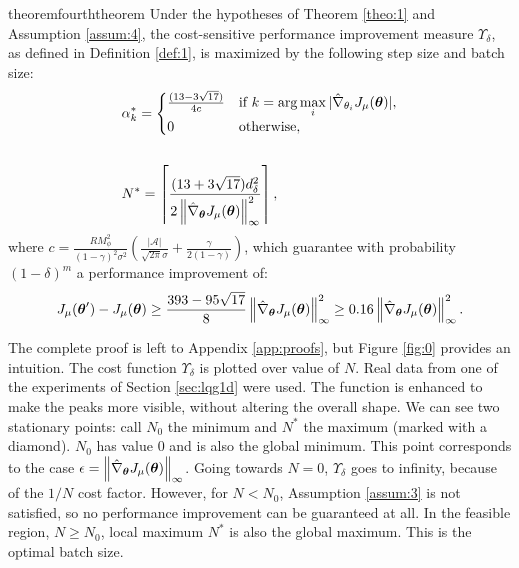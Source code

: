 \begin{restatable}{theorem}{fourththeorem}\label{theo:5}
Under the hypotheses of Theorem \ref{theo:1} and Assumption \ref{assum:4}, the cost-sensitive performance improvement measure $\Upsilon_\delta$, as defined in Definition \ref{def:1}, is maximized by the following step size and batch size: 
\begin{align*}
&\alpha_k^* = 
\begin{cases}  
	\frac{(13-3\sqrt{17})}
		{4c} & 
		\text{if } k = \arg\max\limits_i |\gradApp{\theta_i}|,	\\
		0 & \text{otherwise},
\end{cases}
\\\\
&N^* = \left\lceil\frac{(13+3\sqrt{17})d_{\delta}^2}{2\norm[\infty]{\gradApp{\vtheta}}^2}\right\rceil,
\end{align*}
where $c = \frac{RM_{\phi}^2}{(1-\gamma)^2\sigma^2}\left(\frac{|\mathcal{A}|}{\sqrt{2\pi}\sigma} +	\frac{\gamma}{2(1-\gamma)}\right)$, which guarantee with probability $(1-\delta)^m$ a performance improvement of:
\[
\DeltaJ \geq
\frac{393-95\sqrt{17}}{8}\norm[\infty]{\gradApp{\vtheta}}^2 \geq 0.16 \norm[\infty]{\gradApp{\vtheta}}^2.
\]
\end{restatable}

The complete proof is left to Appendix \ref{app:proofs}, but Figure \ref{fig:0} provides an intuition. The cost function $\Upsilon_\delta$ is plotted over value of $N$. Real data from one of the experiments of Section \ref{sec:lqg1d} were used. The function is enhanced to make the peaks more visible, without altering the overall shape. We can see two stationary points: call $N_0$ the minimum and $N^*$ the maximum (marked with a diamond). $N_0$ has value $0$ and is also the global minimum. This point corresponds to the case $\epsilon = \norm[\infty]{\gradApp{\vtheta}}$. Going towards $N=0$, $\Upsilon_\delta$ goes to infinity, because of the $1/N$ cost factor. However, for $N<N_0$, Assumption \ref{assum:3} is not satisfied, so no performance improvement can be guaranteed at all. In the feasible region, $N\geq N_0$, local maximum $N^*$ is also the global maximum. This is the optimal batch size.

